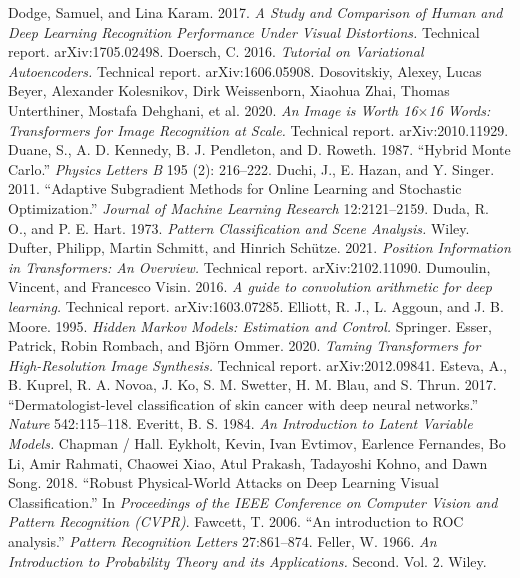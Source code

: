  Dodge, Samuel, and Lina Karam. 2017. \emph{A Study and Comparison of Human and Deep Learning Recognition Performance Under Visual Distortions.} Technical report. arXiv:1705.02498.
 Doersch, C. 2016. \emph{Tutorial on Variational Autoencoders.} Technical report. arXiv:1606.05908.
 Dosovitskiy, Alexey, Lucas Beyer, Alexander Kolesnikov, Dirk Weissenborn, Xiaohua Zhai, Thomas Unterthiner, Mostafa Dehghani, et al. 2020. \emph{An Image is Worth 16$\times$16 Words: Transformers for Image Recognition at Scale.} Technical report. arXiv:2010.11929.
 Duane, S., A. D. Kennedy, B. J. Pendleton, and D. Roweth. 1987. ``Hybrid Monte Carlo.'' \emph{Physics Letters B} 195 (2): 216--222.
 Duchi, J., E. Hazan, and Y. Singer. 2011. ``Adaptive Subgradient Methods for Online Learning and Stochastic Optimization.'' \emph{Journal of Machine Learning Research} 12:2121--2159.
 Duda, R. O., and P. E. Hart. 1973. \emph{Pattern Classification and Scene Analysis.} Wiley.
 Dufter, Philipp, Martin Schmitt, and Hinrich Sch\"utze. 2021. \emph{Position Information in Transformers: An Overview.} Technical report. arXiv:2102.11090.
 Dumoulin, Vincent, and Francesco Visin. 2016. \emph{A guide to convolution arithmetic for deep learning.} Technical report. arXiv:1603.07285.
 Elliott, R. J., L. Aggoun, and J. B. Moore. 1995. \emph{Hidden Markov Models: Estimation and Control.} Springer.
 Esser, Patrick, Robin Rombach, and Bj\"orn Ommer. 2020. \emph{Taming Transformers for High-Resolution Image Synthesis.} Technical report. arXiv:2012.09841.
 Esteva, A., B. Kuprel, R. A. Novoa, J. Ko, S. M. Swetter, H. M. Blau, and S. Thrun. 2017. ``Dermatologist-level classification of skin cancer with deep neural networks.'' \emph{Nature} 542:115--118.
 Everitt, B. S. 1984. \emph{An Introduction to Latent Variable Models.} Chapman / Hall.
 Eykholt, Kevin, Ivan Evtimov, Earlence Fernandes, Bo Li, Amir Rahmati, Chaowei Xiao, Atul Prakash, Tadayoshi Kohno, and Dawn Song. 2018. ``Robust Physical-World Attacks on Deep Learning Visual Classification.'' In \emph{Proceedings of the IEEE Conference on Computer Vision and Pattern Recognition (CVPR)}.
 Fawcett, T. 2006. ``An introduction to ROC analysis.'' \emph{Pattern Recognition Letters} 27:861--874.
 Feller, W. 1966. \emph{An Introduction to Probability Theory and its Applications.} Second. Vol. 2. Wiley.
